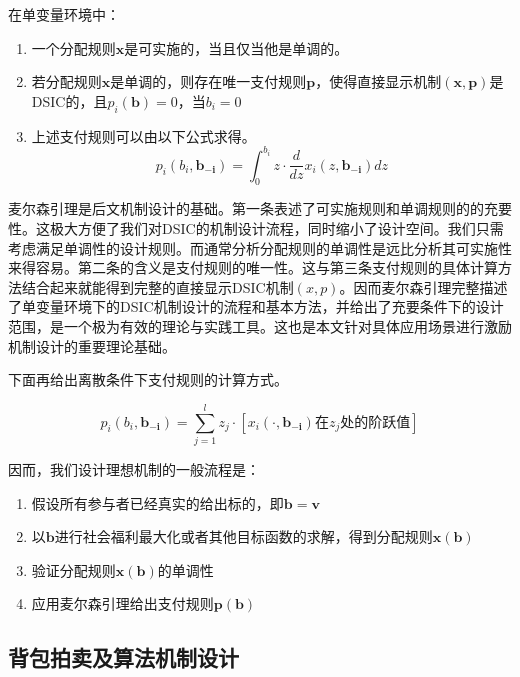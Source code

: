 \documentclass[promaster]{thesis-uestc}
\begin{document}
\begin{theorem}[麦尔森引理]
    在单变量环境中：
    \begin{enumerate}
        \item 一个分配规则$\mathbf{x}$是可实施的，当且仅当他是单调的。
        \item 若分配规则$\mathbf{x}$是单调的，则存在唯一支付规则$\mathbf{p}$，使得直接显示机制$\mathbf{(x,p)}$是DSIC的，且$p_i(\mathbf{b})=0$，当$b_i=0$
        \item 上述支付规则可以由以下公式求得。
        $$p_i(b_i,\mathbf{b_{-i}})=\int_0^{b_i}{z\cdot\frac{d}{dz}x_i(z,\mathbf{b_{-i}})dz}$$
    \end{enumerate}
\end{theorem}

麦尔森引理是后文机制设计的基础。第一条表述了可实施规则和单调规则的的充要性。这极大方便了我们对DSIC的机制设计流程，同时缩小了设计空间。我们只需考虑满足单调性的设计规则。而通常分析分配规则的单调性是远比分析其可实施性来得容易。第二条的含义是支付规则的唯一性。这与第三条支付规则的具体计算方法结合起来就能得到完整的直接显示DSIC机制$(x,p)$。因而麦尔森引理完整描述了单变量环境下的DSIC机制设计的流程和基本方法，并给出了充要条件下的设计范围，是一个极为有效的理论与实践工具。这也是本文针对具体应用场景进行激励机制设计的重要理论基础。

下面再给出离散条件下支付规则的计算方式。

\begin{equation}
\label{myersonlisan}
p_i(b_i,\mathbf{b_{-i}})=\sum_{j=1}^l{z_j\cdot[x_i(\cdot,\mathbf{b_{-i}})\text{在}z_j\text{处的阶跃值}]}
\end{equation}

因而，我们设计理想机制的一般流程是：

\begin{enumerate}
    \item 假设所有参与者已经真实的给出标的，即$\mathbf{b} = \mathbf{v}$
    \item 以$\mathbf{b}$进行社会福利最大化或者其他目标函数的求解，得到分配规则$\mathbf{x(b)}$
    \item 验证分配规则$\mathbf{x(b)}$的单调性
    \item 应用麦尔森引理给出支付规则$\mathbf{p(b)}$
\end{enumerate}


\subsection{背包拍卖及算法机制设计}
\end{document}
